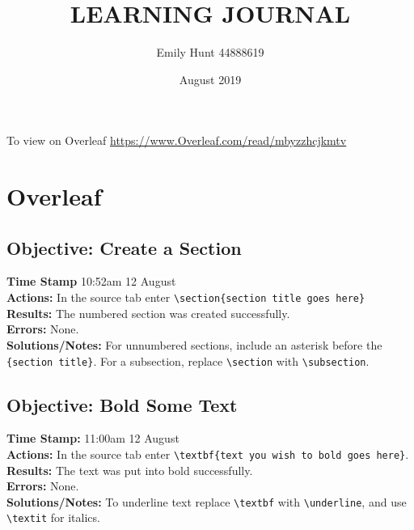 \documentclass{article}
\title{\textbf{LEARNING JOURNAL}}
\author{Emily Hunt 44888619}
\date{August 2019}
\begin{document}
\maketitle
\begin{FlushLeft}

To view on Overleaf \url{https://www.Overleaf.com/read/mbyzzhcjkmtv}

\tableofcontents
\pagebreak

\section{Overleaf}

\subsection{Objective: Create a Section}
\textbf{Time Stamp} 10:52am 12 August\\
\textbf{Actions:} In the source tab enter
\verb|\section{section title goes here}|\\
\textbf{Results:} The numbered section was created successfully.\\
\textbf{Errors:} None.\\
\textbf{Solutions/Notes:} For unnumbered sections, include an asterisk before the \verb|{section title}|. For a subsection, replace \verb|\section| with \verb|\subsection|.

\subsection{Objective: Bold Some Text}
\textbf{Time Stamp:} 11:00am  12 August\\
\textbf{Actions:} In the source tab enter \verb|\textbf{text you wish to bold goes here}|.\\
\textbf{Results:} The text was put into bold successfully.\\
\textbf{Errors:} None.\\
\textbf{Solutions/Notes:} To underline text replace \verb|\textbf| with \verb|\underline|, and use \verb|\textit| for italics.


\end{FlushLeft}
\end{document}
